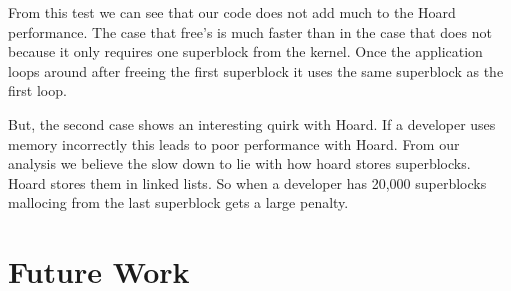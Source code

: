 \documentclass[9pt]{sig-alternate-10pt}
\begin{document}
From this test we can see that our code does not add much to the Hoard performance. The case that free's is much faster than in the case that does not because it only requires one superblock from the kernel. Once the application loops around after freeing the first superblock it uses the same superblock as the first loop.

But, the second case shows an interesting quirk with Hoard. If a developer uses memory incorrectly this leads to poor performance with Hoard. From our analysis we believe the slow down to lie with how hoard stores superblocks. Hoard stores them in linked lists. So when a developer has 20,000 superblocks mallocing from the last superblock gets a large penalty.


\section{Future Work}
\label{future work}
\end{document}
